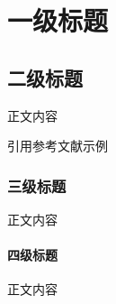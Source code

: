 \chapter{一级标题}

\section{二级标题}
正文内容

引用参考文献示例\cite{upper1974unsuccessful}

\subsection{三级标题}
正文内容

\subsubsection{四级标题}
正文内容

